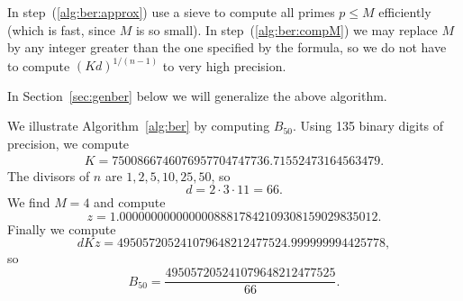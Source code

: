 In step~(\ref{alg:ber:approx}) use a sieve to compute all primes $p\leq
M$ efficiently (which is fast, since $M$ is so small).  In
step~(\ref{alg:ber:compM}) we may replace $M$ by any integer greater
than the one specified by the formula, so we do not have to compute
$(Kd)^{1/(n-1)}$ to very high precision.

In Section~\ref{sec:genber} below we will
generalize the above algorithm.

\begin{example}
We illustrate Algorithm~\ref{alg:ber} by computing $B_{50}$.
Using 135 binary digits of precision, we compute
\begin{eqnarray*}
  K=7500866746076957704747736.71552473164563479.
\end{eqnarray*}
The divisors of $n$ are $1, 2, 5, 10, 25, 50$, so
$$
  d = 2\cdot 3\cdot 11=66.
$$
We find $M=4$ and compute
$$
  z = 1.00000000000000088817842109308159029835012.
$$
Finally we compute
$$
  dKz =
 495057205241079648212477524.999999994425778,
$$
so
$$
  B_{50}=\frac{495057205241079648212477525}{66}.
$$
\end{example}








